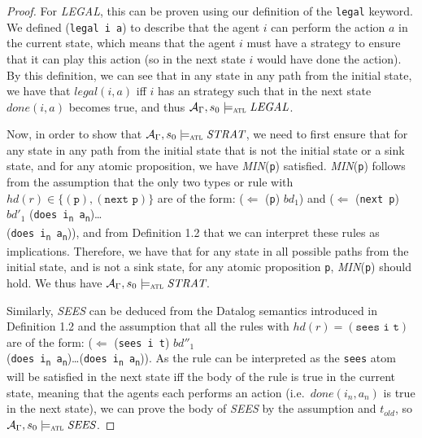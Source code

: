\documentclass{article}
\theoremstyle{theorem}
\theoremstyle{lemma}
\theoremstyle{definition}
\theoremstyle{remark}
\begin{document}
\begin{proof}
    \par For \textit{LEGAL}, this can be proven using our definition of the \texttt{legal} keyword. We defined \newline (\texttt{legal i a}) to describe that the agent $i$ can perform the action $a$ in the current state, which means that the agent $i$ must have a strategy to ensure that it can play this action (so in the next state $i$ would have done the action). By this definition, we can see that in any state in any path from the initial state, we have that $legal(i,a)$ iff $i$ has an strategy such that in the next state $done(i,a)$ becomes true, and thus $\mathcal{A}_\Gamma, s_0 \models_\textsc{atl} \textit{LEGAL}$.
    \par Now, in order to show that $\mathcal{A}_\Gamma, s_0 \models_\textsc{atl} \textit{STRAT}$, we need to first ensure that for any state in any path from the initial state that is not the initial state or a sink state, and for any atomic proposition, we have \textit{MIN}(\texttt{p}) satisfied. \textit{MIN}(\texttt{p}) follows from the assumption that the only two types or rule with $hd(r) \in \{(\texttt{p}),(\texttt{next p})\}$ are of the form: ($\Leftarrow$ (\texttt{p}) $bd_1$) and ($\Leftarrow$ (\texttt{next p}) $bd'_1$ (\texttt{does i\textsubscript{\texttt{n}} a\textsubscript{\texttt{n}}})\ldots \\ (\texttt{does i\textsubscript{\texttt{n}} a\textsubscript{\texttt{n}}})), and from Definition 1.2 that we can interpret these rules as implications. Therefore, we have that for any state in all possible paths from the initial state, and is not a sink state, for any atomic proposition \texttt{p}, \textit{MIN}(\texttt{p}) should hold. We thus have $\mathcal{A}_\Gamma, s_0 \models_\textsc{atl} \textit{STRAT}$.
    \par Similarly, \textit{SEES} can be deduced from the Datalog semantics introduced in Definition 1.2 and the assumption that all the rules with $hd(r) = (\texttt{sees i t})$ are of the form: ($\Leftarrow$ (\texttt{sees i t}) $bd''_1$  \\ (\texttt{does i\textsubscript{\texttt{n}} a\textsubscript{\texttt{n}}})\ldots (\texttt{does i\textsubscript{\texttt{n}} a\textsubscript{\texttt{n}}})). As the rule can be interpreted as the \texttt{sees} atom will be satisfied in the next state iff the body of the rule is true in the current state, meaning that the agents each performs an action (i.e.\ $done(i_n, a_n)$ is true in the next state), we can prove the body of \textit{SEES} by the assumption and $t_{old}$, so $\mathcal{A}_\Gamma, s_0 \models_\textsc{atl} \textit{SEES}$.

\end{proof}
\end{document}
